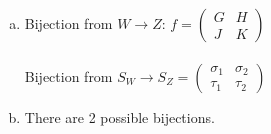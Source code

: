 \begin{enumerate}[(a)]
\item
Bijection from $W\rightarrow Z$:
$f = \begin{pmatrix}
G & H\\
J & K
\end{pmatrix}$\\
\\
Bijection from $S_W \rightarrow S_Z = \begin{pmatrix}
\sigma_1 & \sigma_2\\
\tau_1 & \tau_2 
\end{pmatrix}$

\item
There are 2 possible bijections.
\end{enumerate}

